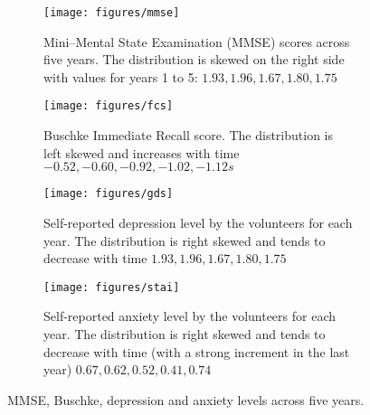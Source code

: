 \documentclass[11pt]{article}
\begin{document}
\begin{figure}[ht!]
    \centering
    \begin{subfigure}[t]{\textwidth}
        \centering
        \texttt{[image: figures/mmse]}
        \caption{Mini–Mental State Examination (MMSE) scores across five years. The distribution is skewed on the right side with values for years 1 to 5: $1.93, 1.96, 1.67, 1.80, 1.75$}

    \end{subfigure}
    
    \begin{subfigure}[t]{\textwidth}
        \centering
        \texttt{[image: figures/fcs]}
        \caption{Buschke Immediate Recall score. The distribution is left skewed and increases with time $-0.52, -0.60, -0.92, -1.02, -1.12s$ }
    \end{subfigure}%
    
     \begin{subfigure}[t]{\textwidth}
        \centering
        \texttt{[image: figures/gds]}
        \caption{Self-reported depression level by the volunteers for each year. The distribution is right skewed and tends to decrease with time $1.93, 1.96, 1.67, 1.80, 1.75$ }
    \end{subfigure}
    
    \begin{subfigure}[t]{\textwidth}
        \centering
        \texttt{[image: figures/stai]}
        \caption{Self-reported anxiety level by the volunteers for each year. The distribution is right skewed and tends to decrease with time (with a strong increment in the last year) $0.67, 0.62, 0.52, 0.41, 0.74$}
    \end{subfigure}%
    \label{fig:staigds}
    \caption{MMSE, Buschke, depression and anxiety levels across five years.}
\end{figure}
\end{document}
